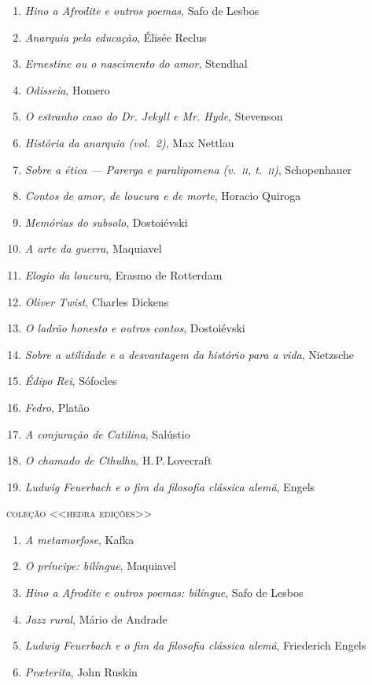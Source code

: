\begin{enumerate}
\item \textit{Hino a Afrodite e outros poemas}, Safo de Lesbos 
\item \textit{Anarquia pela educação}, Élisée Reclus 
\item \textit{Ernestine ou o nascimento do amor}, Stendhal
\item \textit{Odisseia}, Homero
\item \textit{O estranho caso do Dr. Jekyll e Mr. Hyde}, Stevenson
\item \textit{História da anarquia (vol.~2)}, Max Nettlau
\item \textit{Sobre a ética --- Parerga e paralipomena (v.~\textsc{ii}, t.~\textsc{ii})}, Schopenhauer 
\item \textit{Contos de amor, de loucura e de morte}, Horacio Quiroga
\item \textit{Memórias do subsolo}, Dostoiévski
\item \textit{A arte da guerra}, Maquiavel
\item \textit{Elogio da loucura}, Erasmo de Rotterdam
\item \textit{Oliver Twist}, Charles Dickens
\item \textit{O ladrão honesto e outros contos}, Dostoiévski
\item \textit{Sobre a utilidade e a desvantagem da histório para a vida}, Nietzsche
\item \textit{Édipo Rei}, Sófocles
\item \textit{Fedro}, Platão
\item \textit{A conjuração de Catilina}, Salústio
\item \textit{O chamado de Cthulhu}, H.\,P.\,Lovecraft
\item \textit{Ludwig Feuerbach e o fim da filosofia clássica alemã}, Engels
\end{enumerate}

\medskip
{\large\textsc{coleção <<hedra edições>>}}\\

\begin{enumerate}
\setlength\parskip{4.2pt}
\setlength\itemsep{-1.4mm}
\item \textit{A metamorfose}, Kafka
\item \textit{O príncipe: bilíngue}, Maquiavel
\item \textit{Hino a Afrodite e outros poemas: bilíngue}, Safo de Lesbos 
\item \textit{Jazz rural}, Mário de Andrade
\item \textit{Ludwig Feuerbach e o fim da filosofia clássica alemã}, Friederich Engels
\item \textit{Pr\ae terita}, John Ruskin
\end{enumerate}

